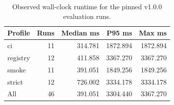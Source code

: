 \begin{table}[t]
\centering
\small
\caption{Observed wall-clock runtime for the pinned v1.0.0 evaluation runs.}
\label{tab:runtime-overhead}
\begin{tabular}{lrrrr}
\toprule
Profile & Runs & Median ms & P95 ms & Max ms \\
\midrule
ci & 11 & 314.781 & 1872.894 & 1872.894 \\
registry & 12 & 411.858 & 3367.270 & 3367.270 \\
smoke & 11 & 391.051 & 1849.256 & 1849.256 \\
strict & 12 & 726.002 & 3334.178 & 3334.178 \\
\midrule
All & 46 & 391.051 & 3304.440 & 3367.270 \\
\bottomrule
\end{tabular}
\end{table}
